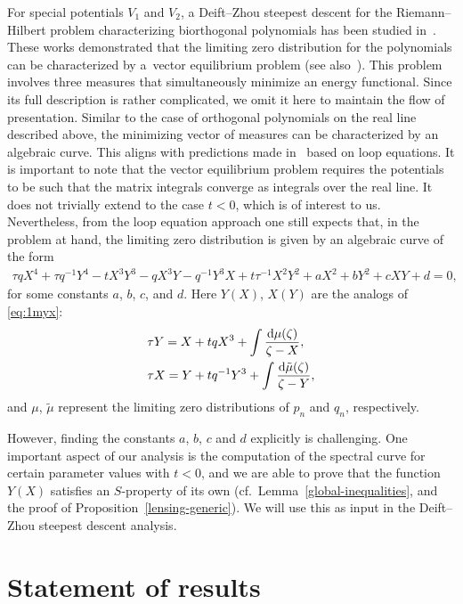 \documentclass[pdftex]{sigma}
\numberwithin{equation}{section}
\begin{document}
For special potentials $V_1$ and $V_2$, a Deift--Zhou steepest descent for the Riemann--Hilbert problem characterizing biorthogonal polynomials has been studied in~\cite{DG, DK1,DKM}. These works demonstrated that the limiting zero distribution for the polynomials can be characterized by a~vector equilibrium problem (see also~\cite{DGK}). This problem involves three measures that simultaneously minimize an energy functional. Since its full description is rather complicated, we omit it here to maintain the flow of presentation. Similar to the case of orthogonal polynomials on the real line described above, the minimizing vector of measures can be characterized by an algebraic curve. This aligns with predictions made in~\cite{Eynard,Orantin} based on loop equations. It is important to note that the vector equilibrium problem requires the potentials to be such that the matrix integrals converge as integrals over the real line. It does not trivially extend to the case $t<0$, which is of interest to us. Nevertheless, from the loop equation approach one still expects that, in the problem at hand, the limiting zero distribution is given by an algebraic curve of the form
\begin{align*}
 \tau q X^4 + \tau q^{-1}Y^4 -tX^3Y^3 - qX^3Y - q^{-1}Y^3X + t\tau^{-1}X^2Y^2
 + a X^2 + b Y^2 + c XY + d=0,
\end{align*}
for some constants $a$, $b$, $c$, and $d$. Here $Y(X)$, $X(Y)$ are the analogs of \eqref{eq:1myx}:
 \begin{align*} %
& \tau Y=X + t q X^3 + \int \frac{{\rm d}\mu(\zeta)}{\zeta - X},\\
& \tau X=Y + t q^{-1} Y^3 + \int \frac{{\rm d}\tilde \mu(\zeta)}{\zeta - Y},
 \end{align*}
and $\mu$, $\tilde{\mu}$ represent the limiting zero distributions of $p_n$ and $q_n$, respectively.

 However, finding the constants $a$, $b$, $c$ and $d$ explicitly is challenging. One important aspect of our analysis is the computation of the spectral curve for certain parameter values with $t<0$, and we are able to prove that the function $Y(X)$ satisfies an $S$-property of its own (cf.\ Lemma~\ref{global-inequalities}, and the proof of Proposition~\ref{lensing-generic}).
We will use this as input in the Deift--Zhou steepest descent analysis.

\section{Statement of results}
\end{document}
